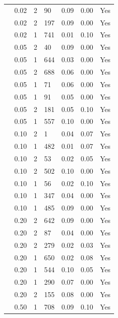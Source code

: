 \begin{longtable}{ | M{2.0cm} | M{2.0cm} | M{1.5cm} | M{1.5cm} | M{2.0cm} | M{2.0cm} | M{1.5cm} | }
                 & 0.02 & 2 & 90  & 0.09 & 0.00 & Yes \\
                 & 0.02 & 2 & 197 & 0.09 & 0.00 & Yes \\
                 & 0.02 & 1 & 741 & 0.01 & 0.10 & Yes \\
                 & 0.05 & 2 & 40  & 0.09 & 0.00 & Yes \\
                 & 0.05 & 1 & 644 & 0.03 & 0.00 & Yes \\
                 & 0.05 & 2 & 688 & 0.06 & 0.00 & Yes \\
                 & 0.05 & 1 & 71  & 0.06 & 0.00 & Yes \\
                 & 0.05 & 1 & 91  & 0.05 & 0.00 & Yes \\
                 & 0.05 & 2 & 181 & 0.05 & 0.10 & Yes \\
                 & 0.05 & 1 & 557 & 0.10 & 0.00 & Yes \\
                 & 0.10 & 2 & 1   & 0.04 & 0.07 & Yes \\
                 & 0.10 & 1 & 482 & 0.01 & 0.07 & Yes \\
                 & 0.10 & 2 & 53  & 0.02 & 0.05 & Yes \\
                 & 0.10 & 2 & 502 & 0.10 & 0.00 & Yes \\
                 & 0.10 & 1 & 56  & 0.02 & 0.10 & Yes \\
                 & 0.10 & 1 & 347 & 0.04 & 0.00 & Yes \\
                 & 0.10 & 1 & 485 & 0.09 & 0.00 & Yes \\
                 & 0.20 & 2 & 642 & 0.09 & 0.00 & Yes \\
                 & 0.20 & 2 & 87  & 0.04 & 0.00 & Yes \\
                 & 0.20 & 2 & 279 & 0.02 & 0.03 & Yes \\
                 & 0.20 & 1 & 650 & 0.02 & 0.08 & Yes \\
                 & 0.20 & 1 & 544 & 0.10 & 0.05 & Yes \\
                 & 0.20 & 1 & 290 & 0.07 & 0.00 & Yes \\
                 & 0.20 & 2 & 155 & 0.08 & 0.00 & Yes \\
                 & 0.50 & 1 & 708 & 0.09 & 0.10 & Yes \\

\end{longtable}
